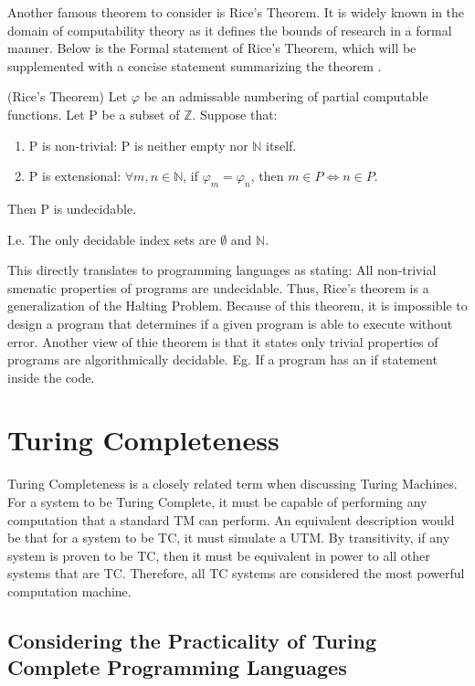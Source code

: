 Another famous theorem to consider is Rice's Theorem.
It is widely known in the domain of computability theory as it defines the bounds of research in a formal manner.
Below is the Formal statement of Rice's Theorem, which will be supplemented with a concise statement summarizing the theorem \cite{WolframRiceThm,WikiRiceThm}.

\begin{thm}
    \label{thm:RiceThm}
    (Rice's Theorem) Let $\varphi$ be an admissable numbering of partial computable functions. 
    Let P be a subset of $\mathbb{Z}$.
    Suppose that:
    \begin{enumerate}
        \item P is non-trivial: P is neither empty nor $\mathbb{N}$ itself.
        \item P is extensional: $\forall  m,n \in \mathbb{N}$, if $\varphi_{m} = \varphi_{n}$,
        then $m \in P \Leftrightarrow n \in P$.
    \end{enumerate}
    Then P is undecidable.

    I.e. The only decidable index sets are $\emptyset$ and $\mathbb{N}$.
\end{thm}

This directly translates to programming languages as stating: All non-trivial smenatic properties of programs are undecidable.
Thus, Rice's theorem is a generalization of the Halting Problem.
Because of this theorem, it is impossible to design a program that determines if a given program is able to execute without error.
Another view of thie theorem is that it states only trivial properties of programs are algorithmically decidable.
Eg. If a program has an if statement inside the code.

\section{Turing Completeness}\label{sec:TC}

Turing Completeness is a closely related term when discussing Turing Machines.
For a system to be Turing Complete, it must be capable of performing any computation that a standard TM can perform.
An equivalent description would be that for a system to be TC, it must simulate a UTM.
By transitivity, if any system is proven to be TC, then it must be equivalent in power to all other systems that are TC.
Therefore, all TC systems are considered the most powerful computation machine.

\subsection{Considering the Practicality of Turing Complete Programming Languages}\label{subsec:PracticalTC}

